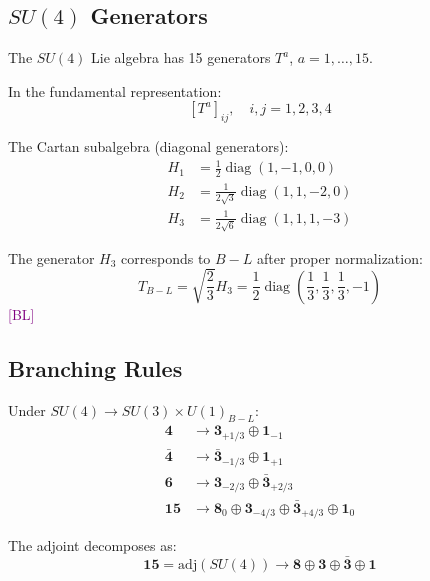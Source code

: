 \documentclass[11pt,a4paper]{article}
\newcommand{\tagBL}{\textcolor{purple}{[BL]}}
\DeclareMathOperator{\diag}{diag}
\begin{document}
\subsection{$SU(4)$ Generators}

The $SU(4)$ Lie algebra has 15 generators $T^a$, $a = 1, \ldots, 15$.

In the fundamental representation:
\begin{equation}
\label{eq:su4-fund-gen}
[T^a]_{ij}, \quad i,j = 1, 2, 3, 4
\end{equation}

The Cartan subalgebra (diagonal generators):
\begin{align}
\label{eq:su4-cartan-1}
H_1 &= \frac{1}{2}\diag(1, -1, 0, 0) \\
\label{eq:su4-cartan-2}
H_2 &= \frac{1}{2\sqrt{3}}\diag(1, 1, -2, 0) \\
\label{eq:su4-cartan-3}
H_3 &= \frac{1}{2\sqrt{6}}\diag(1, 1, 1, -3)
\end{align}

The generator $H_3$ corresponds to $B-L$ after proper normalization:
\begin{equation}
\label{eq:BL-from-H3}
T_{B-L} = \sqrt{\frac{2}{3}} H_3 = \frac{1}{2}\diag\left(\frac{1}{3}, \frac{1}{3}, \frac{1}{3}, -1\right)
\end{equation}
\tagBL

\subsection{Branching Rules}

Under $SU(4) \to SU(3) \times U(1)_{B-L}$:
\begin{align}
\label{eq:branch-4}
\mathbf{4} &\to \mathbf{3}_{+1/3} \oplus \mathbf{1}_{-1} \\
\label{eq:branch-4bar}
\bar{\mathbf{4}} &\to \bar{\mathbf{3}}_{-1/3} \oplus \mathbf{1}_{+1} \\
\label{eq:branch-6}
\mathbf{6} &\to \mathbf{3}_{-2/3} \oplus \bar{\mathbf{3}}_{+2/3} \\
\label{eq:branch-15}
\mathbf{15} &\to \mathbf{8}_0 \oplus \mathbf{3}_{-4/3} \oplus \bar{\mathbf{3}}_{+4/3} \oplus \mathbf{1}_0
\end{align}

The adjoint decomposes as:
\begin{equation}
\label{eq:adj-decomp}
\mathbf{15} = \text{adj}(SU(4)) \to \mathbf{8} \oplus \mathbf{3} \oplus \bar{\mathbf{3}} \oplus \mathbf{1}
\end{equation}
\end{document}
